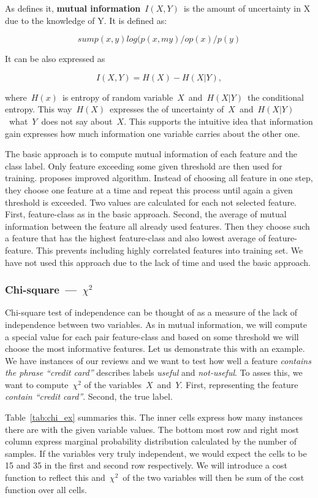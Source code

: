As \citet{Hoq14} defines it, {\bf mutual information}~$I(X, Y)$~is the amount of uncertainty in X due to the knowledge of Y. It is defined as:

$$sum p(x,y) log(p(x,my)/op(x)/p(y)$$

It can be also expressed as

$$I(X, Y) = H(X) - H(X|Y),$$

where~$H(x)$~is entropy of random variable~$X$~and~$H(X|Y)$~the conditional entropy.
This way~$H(X)$~expresses the of uncertainty of~$X$~and~$H(X|Y)$~what~$Y$~does not say about~$X$.
This supports the intuitive idea that information gain expresses how much information one variable carries about the other one.

The basic approach is to compute mutual information of each feature and the class label.
Only feature exceeding some given threshold are then used for training.
\citet{Hoq14} proposes improved algorithm.
Instead of choosing all feature in one step, they choose one feature at a time and repeat this process until again a given threshold is exceeded.
Two values are calculated for each not selected feature.
First, feature-class as in the basic approach.
Second, the average of mutual information between the feature all already used features.
Then they choose such a feature that has the highest feature-class and also lowest average of feature-feature.
This prevents including highly correlated features into training set.
We have not used this approach due to the lack of time and used the basic approach.



\subsubsection{Chi-square~---~$\chi^2$}

Chi-square test of independence can be thought of
as a measure of the lack of independence between two variables.
As in mutual information,
we will compute a special value for each pair feature-class
and based on some threshold we will choose the most informative features.
Let us demonstrate this with an example.
We have instances of our reviews and we want to test how well
a feature \textit{contains the phrase ``credit card''} describes
labels \textit{useful} and \textit{not-useful}.
To asses this, we want to compute~$\chi^2$ of the variables~$X$~and~$Y$.
First, representing the feature \textit{contain ``credit card''}.
Second, the true label.

Table~\ref{tab:chi_ex} summaries this.
The inner cells express how many instances there are with the given variable values.
The bottom most row and right most column express marginal probability distribution 
calculated by the number of samples.
If the variables very truly independent,
we would expect the cells to be 15 and 35 in the first and second row respectively.
We will introduce a cost function to reflect this
and~$\chi^2$~of the two variables will then be sum of the cost function over all cells.


